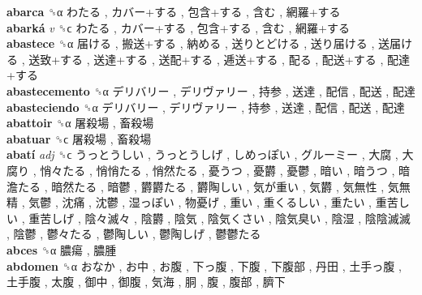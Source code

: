 \textbf{abarca} ␝α   わたる ,  カバー+する ,  包含+する ,  含む ,  網羅+する   \\
\textbf{abarká} \emph{v}  ␝ϲ   わたる ,  カバー+する ,  包含+する ,  含む ,  網羅+する   \\
\textbf{abastece} ␝α   届ける ,  搬送+する ,  納める ,  送りとどける ,  送り届ける ,  送届ける ,  送致+する ,  送達+する ,  送配+する ,  逓送+する ,  配る ,  配送+する ,  配達+する   \\
\textbf{abastecemento} ␝α   デリバリー ,  デリヴァリー ,  持参 ,  送達 ,  配信 ,  配送 ,  配達   \\
\textbf{abasteciendo} ␝α   デリバリー ,  デリヴァリー ,  持参 ,  送達 ,  配信 ,  配送 ,  配達   \\
\textbf{abattoir} ␝α   屠殺場 ,  畜殺場   \\
\textbf{abatuar} ␝ϲ   屠殺場 ,  畜殺場   \\
\textbf{abatí} \emph{adj}  ␝ϲ   うっとうしい ,  うっとうしげ ,  しめっぽい ,  グルーミー ,  大腐 ,  大腐り ,  悄々たる ,  悄悄たる ,  悄然たる ,  憂うつ ,  憂欝 ,  憂鬱 ,  暗い ,  暗うつ ,  暗澹たる ,  暗然たる ,  暗鬱 ,  欝欝たる ,  欝陶しい ,  気が重い ,  気欝 ,  気無性 ,  気無精 ,  気鬱 ,  沈痛 ,  沈鬱 ,  湿っぽい ,  物憂げ ,  重い ,  重くるしい ,  重たい ,  重苦しい ,  重苦しげ ,  陰々滅々 ,  陰欝 ,  陰気 ,  陰気くさい ,  陰気臭い ,  陰湿 ,  陰陰滅滅 ,  陰鬱 ,  鬱々たる ,  鬱陶しい ,  鬱陶しげ ,  鬱鬱たる   \\
\textbf{abces} ␝α   膿瘍 ,  膿腫   \\
\textbf{abdomen} ␝α   おなか ,  お中 ,  お腹 ,  下っ腹 ,  下腹 ,  下腹部 ,  丹田 ,  土手っ腹 ,  土手腹 ,  太腹 ,  御中 ,  御腹 ,  気海 ,  胴 ,  腹 ,  腹部 ,  臍下   \\
